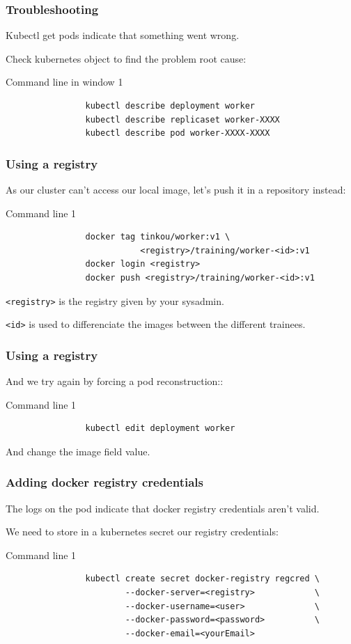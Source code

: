	\begin{frame}[fragile]
		\frametitle{Troubleshooting}
		
		Kubectl get pods indicate that something went wrong.
		
		Check kubernetes object to find the problem root cause:
		\begin{block}{Command line in window 1}
			\begin{verbatim}
				kubectl	describe deployment worker
				kubectl describe replicaset worker-XXXX
				kubectl describe pod worker-XXXX-XXXX
			\end{verbatim}
		\end{block}
		
	\end{frame}
	
	\begin{frame}[fragile]
		\frametitle{Using a registry}
		
		As our cluster can't access our local image, let's push it in a repository instead:
		\begin{block}{Command line 1}
			\begin{verbatim}
				docker tag tinkou/worker:v1 \
				           <registry>/training/worker-<id>:v1
				docker login <registry>
				docker push <registry>/training/worker-<id>:v1
			\end{verbatim}
		\end{block}
		\verb|<registry>| is the registry given by your sysadmin.
		
		\verb|<id>| is used to differenciate the images between the different trainees.

	\end{frame}
	
	\begin{frame}[fragile]
		\frametitle{Using a registry}
	
		And we try again by forcing a pod reconstruction::
		\begin{block}{Command line 1}
			\begin{verbatim}
				kubectl edit deployment worker
			\end{verbatim}
			\medskip
			And change the image field value.
		\end{block}
	
	\end{frame}

	\begin{frame}[fragile]
		\frametitle{Adding docker registry credentials}
		
		The logs on the pod indicate that docker registry credentials aren't valid.
		
		We need to store in a kubernetes secret our registry credentials:
		\begin{block}{Command line 1}
			\begin{verbatim}
				kubectl create secret docker-registry regcred \
				        --docker-server=<registry>            \
				        --docker-username=<user>              \
				        --docker-password=<password>          \
				        --docker-email=<yourEmail>
			\end{verbatim}
		\end{block}
	\end{frame}
	
